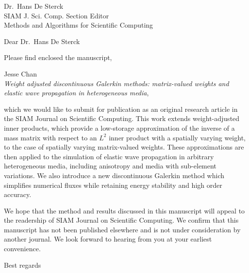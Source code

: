 \documentclass{letter}
\begin{document}
\begin{letter}{Dr.\ Hans De Sterck\\SIAM J. Sci. Comp. Section Editor\\Methods and Algorithms for Scientific Computing}


\opening{Dear Dr.\ Hans De Sterck}

Please find enclosed the manuscript, 
\begin{center}
Jesse Chan\\
\textit{Weight adjusted discontinuous Galerkin methods: matrix-valued weights and elastic wave propagation in heterogeneous media},
\end{center}
which we would like to submit for publication as an original research article in the SIAM Journal on Scientific Computing.  This work extends weight-adjusted inner products, which provide a low-storage approximation of the inverse of a mass matrix with respect to an $L^2$ inner product with a spatially varying weight, to the case of spatially varying matrix-valued weights.  These approximations are then applied to the simulation of elastic wave propagation in arbitrary heterogeneous media, including anisotropy and media with sub-element variations.  We also introduce a new discontinuous Galerkin method which simplifies numerical fluxes while retaining energy stability and high order accuracy.  

We hope that the method and results discussed in this manuscript will appeal to the readership of SIAM Journal on Scientific Computing.  We confirm that this manuscript has not been published elsewhere and is not under consideration by another journal.  We look forward to hearing from you at your earliest convenience.

\closing{Best regards}

\end{letter}
\end{document}
